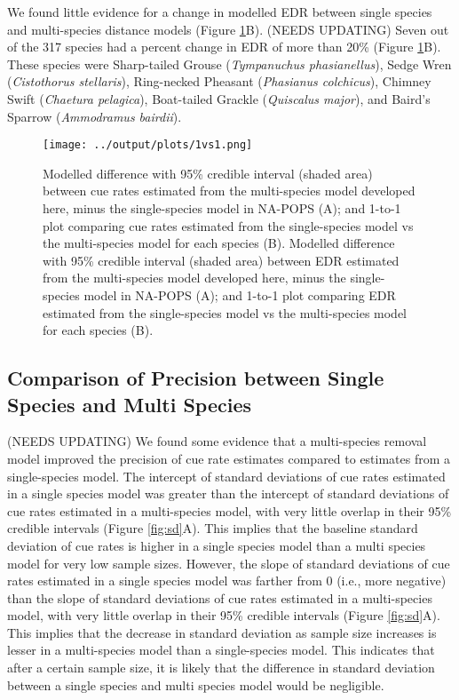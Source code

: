 \documentclass[12pt]{article}
\begin{document}
\par We found little evidence for a change in modelled EDR between single species and multi-species distance models (Figure \ref{fig:1vs1}B). 
(NEEDS UPDATING) Seven out of the 317 species had a percent change in EDR of more than 20\% (Figure \ref{fig:1vs1}B).
These species were Sharp-tailed Grouse (\textit{Tympanuchus phasianellus}), Sedge Wren (\textit{Cistothorus stellaris}), Ring-necked Pheasant (\textit{Phasianus colchicus}), Chimney Swift (\textit{Chaetura pelagica}), Boat-tailed Grackle (\textit{Quiscalus major}), and Baird's Sparrow (\textit{Ammodramus bairdii}).

\begin{figure}[h!]
	\texttt{[image: ../output/plots/1vs1.png]}
	\caption{Modelled difference with 95\% credible interval (shaded area) between cue rates estimated from the multi-species model developed here, minus the single-species model in NA-POPS \citep{edwards_point_2023} (A); and 1-to-1 plot comparing cue rates estimated from the single-species model vs the multi-species model for each species (B). Modelled difference with 95\% credible interval (shaded area) between EDR estimated from the multi-species model developed here, minus the single-species model in NA-POPS \citep{edwards_point_2023} (A); and 1-to-1 plot comparing EDR estimated from the single-species model vs the multi-species model for each species (B).}
	\label{fig:1vs1}
\end{figure}

\subsection{Comparison of Precision between Single Species and Multi Species}

\par (NEEDS UPDATING) We found some evidence that a multi-species removal model improved the precision of cue rate estimates compared to estimates from a single-species model.
The intercept of standard deviations of cue rates estimated in a single species model was greater than the intercept of standard deviations of cue rates estimated in a multi-species model, with very little overlap in their 95\% credible intervals (Figure \ref{fig:sd}A).
This implies that the baseline standard deviation of cue rates is higher in a single species model than a multi species model for very low sample sizes.
However, the slope of standard deviations of cue rates estimated in a single species model was farther from 0 (i.e., more negative) than the slope of standard deviations of cue rates estimated in a multi-species model, with very little overlap in their 95\% credible intervals (Figure \ref{fig:sd}A).
This implies that the decrease in standard deviation as sample size increases is lesser in a multi-species model than a single-species model.
This indicates that after a certain sample size, it is likely that the difference in standard deviation between a single species and multi species model would be negligible.
\end{document}
